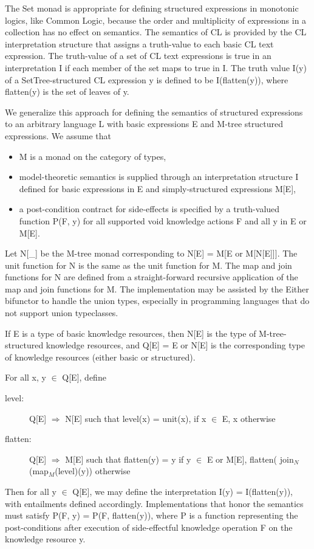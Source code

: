 \documentclass[runningheads]{llncs}
\begin{document}
The Set monad is appropriate for defining structured expressions in monotonic logics, like Common Logic, because the order and multiplicity of expressions in a collection has no effect on semantics. The semantics of CL is provided by the CL interpretation structure that assigns a truth-value to each basic CL text expression. The truth-value of a set of CL text expressions is true in an interpretation I if each member of the set maps to true in I. The truth value I(y) of a SetTree-structured CL expression y is defined to be I(flatten(y)), where flatten(y) is the set of leaves of y.

We generalize this approach for defining the semantics of structured expressions to an arbitrary language L with basic expressions E and M-tree structured expressions. We assume that 
\begin{itemize}
\item M is a monad on the category of types,
\item model-theoretic semantics is supplied through an interpretation structure I defined for basic expressions in E and simply-structured expressions M[E],
\item a post-condition contract for side-effects is specified by a truth-valued function P(F, y) for all supported void knowledge actions F and all y in E or M[E].
\end{itemize}

Let N[\_] be the M-tree monad corresponding to N[E] = M[E or M[N[E]]].
The unit function for N is the same as the unit function for M.
The map and join functions for N are defined from a straight-forward recursive application of the map and join functions for M.
The implementation may be assisted by the Either bifunctor to handle the union types, especially in programming languages that do not support union typeclasses.

If E is a type of basic knowledge resources, then N[E] is the type of M-tree-structured knowledge resources, and
Q[E] = E or N[E] is the corresponding type of knowledge resources (either basic or structured).

For all x, y $\in$ Q[E], define
\begin{description}
\item[level:] Q[E] $\Rightarrow$ N[E] such that level(x) = unit(x), if x $\in$ E, x otherwise
\item[flatten:] Q[E] $\Rightarrow$ M[E] such that flatten(y) = y if y $\in$  E or M[E], flatten( join$_N$(map$_M$(level)(y)) otherwise
\end{description}
Then for all y $\in$ Q[E], we may define the interpretation I(y) = I(flatten(y)), with entailments defined accordingly. %
Implementations that honor the semantics must satisfy P(F, y) = P(F, flatten(y)), where P is a function representing the post-conditions after execution of side-effectful knowledge operation F on the knowledge resource y.
\end{document}
